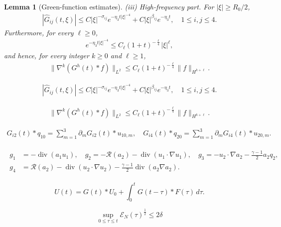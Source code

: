 \documentclass[10pt,a4paper]{amsart}
\newtheorem{lem}{Lemma}
\begin{document}
\begin{lem}[Green-function estimates]
\smallskip
\noindent\emph{(iii) High-frequency part.} For $|\xi|\ge R_0/2$,
\begin{align}\label{high-G-pointwise}
|\widehat G_{ij}(t,\xi)|
\le C|\xi|^{-\sigma_{ij}}e^{-\eta_3  t|\xi|^{-4}}
+C|\xi|^{\beta_{ij}}e^{-\eta_3  t},
\quad 1\le i,j\le4.
\end{align}
Furthermore, for every $\ell\ge0$,
\begin{align}\label{regularity-loss-ineq}
e^{-\eta_3  t|\xi|^{-4}}
\le C_\ell(1+t)^{-\frac\ell4}|\xi|^\ell,
\end{align}
and hence, for every integer $k\ge0$ and $\ell\ge1$,
\begin{align}\label{high-linear-general}
\|\nabla^k(G^h(t)*f)\|_{L^2}
\le C_\ell(1+t)^{-\frac\ell4}\|f\|_{H^{k+\ell}}.
\end{align}
\end{lem}

\begin{align}
|\widehat G_{ij}(t,\xi)|
\le C|\xi|^{-\sigma_{ij}}e^{-\eta_3  t|\xi|^{-4}}
+C|\xi|^{\beta_{ij}}e^{-\eta_3  t},
\quad 1\le i,j\le4.
\end{align}

\begin{align}
\|\nabla^k(G^h(t)*f)\|_{L^2}
\le C_\ell(1+t)^{-\frac\ell4}\|f\|_{H^{k+\ell}}.
\end{align}

\begin{align}\label{IBP-Green}
G_{i2}(t)*q_{10}
=\sum_{m=1}^3\partial_mG_{i2}(t)*u_{10,m},\quad
G_{i4}(t)*q_{20}
=\sum_{m=1}^3\partial_mG_{i4}(t)*u_{20,m}.
\end{align}

\begin{align}\label{nonlinear-g}
\begin{aligned}
g_1&=-\operatorname{div}(a_1u_1),\quad g_2=-\mathcal R(a_2)-\operatorname{div}(u_1\cdot\nabla u_1),\quad g_3=-u_2\cdot\nabla a_2-\frac{\gamma-1}{2}a_2q_2,\\ g_4&=\mathcal R(a_2)-\operatorname{div}(u_2\cdot\nabla u_2)
-\frac{\gamma-1}{2}\operatorname{div}(a_2\nabla a_2).
\end{aligned}
\end{align}

\begin{equation}\label{nonlinear-duhamel}
U(t)=G(t)*U_0+\int_0^tG(t-\tau)*F(\tau)\,d\tau.
\end{equation}

\begin{equation}\label{high-bootstrap}
\sup_{0\le\tau\le t}\mathcal E_N(\tau)^{\frac{1}{2}}\le 2\delta
\end{equation}
\end{document}

